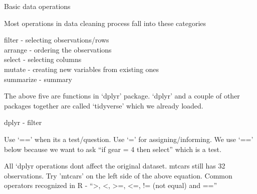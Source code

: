\documentclass[ignorenonframetext,]{beamer}
\newenvironment{Shaded}{\begin{snugshade}}{\end{snugshade}}
\newcommand{\CommentTok}[1]{\textcolor[rgb]{0.56,0.35,0.01}{\textit{#1}}}
\newcommand{\DecValTok}[1]{\textcolor[rgb]{0.00,0.00,0.81}{#1}}
\newcommand{\KeywordTok}[1]{\textcolor[rgb]{0.13,0.29,0.53}{\textbf{#1}}}
\newcommand{\NormalTok}[1]{#1}
\newcommand{\OperatorTok}[1]{\textcolor[rgb]{0.81,0.36,0.00}{\textbf{#1}}}
\newcommand{\StringTok}[1]{\textcolor[rgb]{0.31,0.60,0.02}{#1}}
\begin{document}
\begin{frame}{Basic data operations}
\protect\hypertarget{basic-data-operations}{}

Most operations in data cleaning process fall into these categories

filter - selecting observations/rows\\
arrange - ordering the observations\\
select - selecting columns\\
mutate - creating new variables from existing ones\\
summarize - summary

The above five are functions in `dplyr' package. `dplyr' and a couple of
other packages together are called `tidyverse' which we already loaded.

\end{frame}

\begin{frame}[fragile]{dplyr - filter}
\protect\hypertarget{dplyr---filter}{}

Use `==' when its a test/question. Use `=' for assigning/informing. We
use `==' below because we want to ask ``if gear = 4 then select'' which
is a test.

\begin{Shaded}
\end{Shaded}

All `dplyr operations dont affect the original dataset. mtcars still has
32 observations. Try 'mtcars' on the left side of the above equation.
Common operators recognized in R - ``\textgreater{}, \textless{},
\textgreater{}=, \textless{}=, != (not equal) and ==''

\end{frame}
\end{document}
